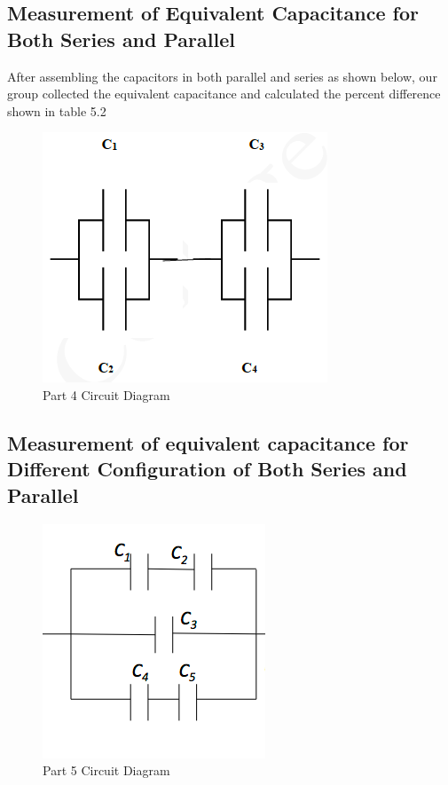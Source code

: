 \documentclass[titlepage]{article}
\begin{document}
        \FloatBarrier
        \subsection{Measurement of Equivalent Capacitance for Both Series and Parallel}
        After assembling the capacitors in both parallel and series as shown below, our group collected the equivalent capacitance and calculated the percent difference shown in table 5.2

        \begin{figure}[hbt!] 
            \centering
            \caption*{Part 4 Circuit Diagram}
            \includegraphics[scale=0.7]{images/procedure/part4.png}
        \end{figure} 


        \subsection{Measurement of equivalent capacitance for Different Configuration of Both Series and Parallel}

        \begin{figure}[hbt!] 
            \centering
            \caption*{Part 5 Circuit Diagram}
            \includegraphics[scale=0.5]{images/procedure/part5.png}
        \end{figure} 
        
\end{document}
